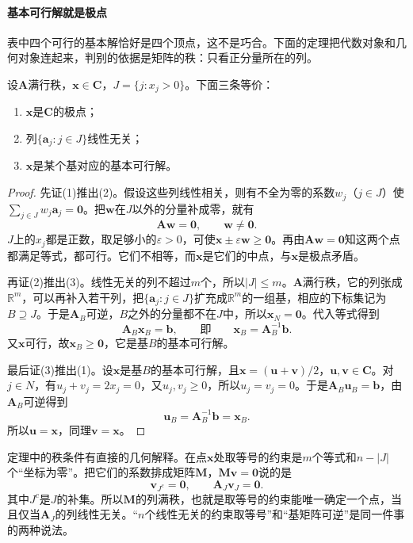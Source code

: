 \paragraph{基本可行解就是极点}
表中四个可行的基本解恰好是四个顶点，这不是巧合。下面的定理把代数对象和几何对象连起来，判别的依据是矩阵的秩：只看正分量所在的列。

\begin{theorem}[基本可行解与极点]
 \label{thm:lp-bfs-extreme}
 设$\bm{A}$满行秩，$\bm{x}\in\bm{C}$，$J=\{j:x_j>0\}$。下面三条等价：
 \begin{enumerate}
  \item $\bm{x}$是$\bm{C}$的极点；
  \item 列$\{\bm{a}_j:j\in J\}$线性无关；
  \item $\bm{x}$是某个基对应的基本可行解。
 \end{enumerate}
\end{theorem}

\begin{proof}
 先证(1)推出(2)。假设这些列线性相关，则有不全为零的系数$w_j$（$j\in J$）使$\sum_{j\in J}w_j\bm{a}_j=\bm{0}$。把$\bm{w}$在$J$以外的分量补成零，就有
 \[
  \bm{A}\bm{w}=\bm{0},\qquad\bm{w}\neq\bm{0}.
 \]
 $J$上的$x_j$都是正数，取足够小的$\varepsilon>0$，可使$\bm{x}\pm\varepsilon\bm{w}\geq\bm{0}$。再由$\bm{A}\bm{w}=\bm{0}$知这两个点都满足等式，都可行。它们不相等，而$\bm{x}$是它们的中点，与$\bm{x}$是极点矛盾。

 再证(2)推出(3)。线性无关的列不超过$m$个，所以$\lvert J\rvert\leq m$。$\bm{A}$满行秩，它的列张成$\mathbb{R}^m$，可以再补入若干列，把$\{\bm{a}_j:j\in J\}$扩充成$\mathbb{R}^m$的一组基，相应的下标集记为$B\supseteq J$。于是$\bm{A}_B$可逆，$B$之外的分量都不在$J$中，所以$\bm{x}_N=\bm{0}$。代入等式得到
 \[
  \bm{A}_B\bm{x}_B=\bm{b},\qquad\text{即}\qquad\bm{x}_B=\bm{A}_B^{-1}\bm{b}.
 \]
 又$\bm{x}$可行，故$\bm{x}_B\geq\bm{0}$，它是基$B$的基本可行解。

 最后证(3)推出(1)。设$\bm{x}$是基$B$的基本可行解，且$\bm{x}=(\bm{u}+\bm{v})/2$，$\bm{u},\bm{v}\in\bm{C}$。对$j\in N$，有$u_j+v_j=2x_j=0$，又$u_j,v_j\geq0$，所以$u_j=v_j=0$。于是$\bm{A}_B\bm{u}_B=\bm{b}$，由$\bm{A}_B$可逆得到
 \[
  \bm{u}_B=\bm{A}_B^{-1}\bm{b}=\bm{x}_B.
 \]
 所以$\bm{u}=\bm{x}$，同理$\bm{v}=\bm{x}$。
\end{proof}

定理中的秩条件有直接的几何解释。在点$\bm{x}$处取等号的约束是$m$个等式和$n-\lvert J\rvert$个“坐标为零”。把它们的系数排成矩阵$\bm{M}$，$\bm{M}\bm{v}=\bm{0}$说的是
\[
 \bm{v}_{J^c}=\bm{0},\qquad\bm{A}_J\bm{v}_J=\bm{0}.
\]
其中$J^c$是$J$的补集。所以$\bm{M}$的列满秩，也就是取等号的约束能唯一确定一个点，当且仅当$\bm{A}_J$的列线性无关。“$n$个线性无关的约束取等号”和“基矩阵可逆”是同一件事的两种说法。

